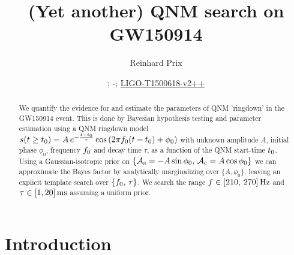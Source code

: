 \documentclass[aps,prd,onecolumn,notitlepage,nofootinbib,superscriptaddress,altaffilletter,floatfix]{revtex4-1}
\newcommand{\dcc}{LIGO-T1500618-v2++}
\begin{document}
\title{(Yet another) QNM search on GW150914}


\author{Reinhard Prix}
\date{\commitDATE; \commitIDshort-\commitSTATUS; \href{https://dcc.ligo.org/LIGO-T1500618}{\dcc}}


\begin{abstract}
  We quantify the evidence for and estimate the parameters of QNM 'ringdown' in the GW150914 event.
  This is done by Bayesian hypothesis testing and parameter estimation using a QNM ringdown model
  $s(t\ge t_0) = A\,e^{-\frac{t-t_0}{\tau}}\cos\left(2\pi f_0 (t-t_0) + \phi_0\right)$ with unknown amplitude $A$, initial phase $\phi_0$,
  frequency $f_0$ and decay time $\tau$, as a function of the QNM start-time $t_0$.
  Using a Gaussian-isotropic prior on $\{\mathcal{A}_{\mathrm{s}}=-A\sin\phi_0,\,\mathcal{A}_{\mathrm{c}}=A\cos\phi_0\}$ we can approximate the Bayes factor by analytically marginalizing over
  $\{A,\phi_0\}$, leaving an explicit template search over $\{f_0,\,\tau\}$. We search the range $f\in[210,\,270]\,\mathrm{Hz}$ and $\tau \in [1, 20]\,\mathrm{ms}$
  assuming a uniform prior.

\end{abstract}

\maketitle

\section{Introduction}
\label{Intro}
\end{document}
